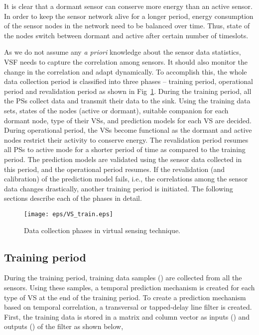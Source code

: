\documentclass[a4paper,conference]{IEEEtran}
\begin{document}
It is clear that a dormant sensor can conserve more energy than an active sensor. In order to keep the sensor network alive for a longer period, energy consumption of the sensor nodes in the network need to be balanced over time.  Thus, state of the nodes switch between dormant and active after certain number of timeslots. 

As we do not assume any \textit{a priori} knowledge about the sensor data statistics, VSF needs to capture the correlation among sensors. It should also monitor the change in the correlation and adapt dynamically. To accomplish this, the whole data collection period is classified into three phases -- training period, operational period and revalidation period as shown in Fig~\ref{fig:vs_train}. During the training period, all the PSs collect data and transmit their data to the sink. Using the training data sets, states of the nodes (active or dormant), suitable companion for each dormant node, type of their VSs, and prediction models for each VS are decided. During operational period, the VSs become functional as the dormant and active nodes restrict their activity to conserve energy. The revalidation period resumes all PSs to active mode for a shorter period of time as compared to the training period. The prediction models are validated using the sensor data collected in this period, and the operational period resumes. If the revalidation (and calibration) of the prediction model fails, i.e., the correlations among the sensor data changes drastically, another training period is initiated. The following sections describe each of the phases in detail.
\begin{figure}
\centering
\texttt{[image: eps/VS\_train.eps]}
\caption{Data collection phases in virtual sensing technique.}
\label{fig:vs_train}
\end{figure}

\subsection{Training period}
During the training period,  training data samples () are collected from all the sensors. Using these samples, a temporal prediction mechanism is created for each type of VS at the end of the training period. To create a prediction mechanism based on temporal correlation, a transversal or tapped-delay line filter is created. First, the training data is stored in a  matrix and  column vector as inputs () and outputs () of the filter as shown below, 
\end{document}
